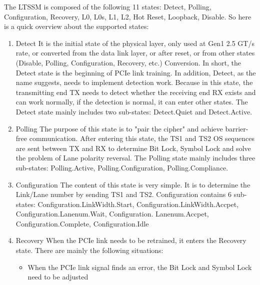 The LTSSM is composed of the following 11 states: Detect, Polling, Configuration, Recovery, L0, L0s, L1, L2, Hot Reset, Loopback, Disable. So here is a quick overview about the supported states:
\begin{enumerate}
    \item Detect \newline 
    It is the initial state of the physical layer, only used at Gen1 2.5 GT/s rate, or converted from the data link layer, or after reset, or from other states (Disable, Polling, Configuration, Recovery, etc.) Conversion. In short, the Detect state is the beginning of PCIe link training. In addition, Detect, as the name suggests, needs to implement detection work. Because in this state, the transmitting end TX needs to detect whether the receiving end RX exists and can work normally, if the detection is normal, it can enter other states. The Detect state mainly includes two sub-states: Detect.Quiet and Detect.Active.
    \item  Polling \newline 
    The purpose of this state is to "pair the cipher" and achieve barrier-free communication. After entering this state, the TS1 and TS2 OS sequences are sent between TX and RX to determine Bit Lock, Symbol Lock and solve the problem of Lane polarity reversal. The Polling state mainly includes three sub-states: Polling.Active, Polling.Configuration, Polling.Compliance.
    \item Configuration \newline 
    The content of this state is very simple. It is to determine the Link/Lane number by sending TS1 and TS2. Configuration contains 6 sub-states: Configuration.LinkWidth.Start, Configuration.LinkWidth.Accpet, Configuration.Lanenum.Wait, Configuration. Lanenum.Accpet, Configuration.Complete, Configuration.Idle

    \item Recovery \newline 
    When the PCIe link needs to be retrained, it enters the Recovery state. There are mainly the following situations:
\begin{itemize}
    \item When the PCIe link signal finds an error, the Bit Lock and Symbol Lock need to be adjusted


\end{itemize}
\end{enumerate}

